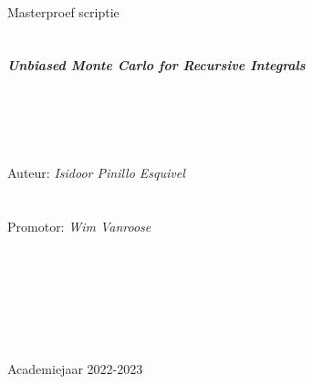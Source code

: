 \begin{titlepage}
    \begin{center}
        \ \
        \ \\
        \ \\
        \ \\
        \ \\
        \ \\
        \ \\
        \ \\
        \ \\
        \ \\
        \ \\
        \ \\
        \Large{M{\sc asterproef scriptie}}
        \ \\
        \ \\
        \ \\
        \huge{\bf{\em Unbiased Monte Carlo for Recursive Integrals}}
        \ \\
        \ \\
        \ \\
        \ \\
        \ \\
        \ \\
        \normalsize
        Auteur: {\em Isidoor Pinillo Esquivel}\\
        \ \\
        \ \\
        Promotor: {\em Wim Vanroose}\\
        \ \\
        \ \\
        \ \\
        \ \\
        \ \\
        \ \\
        \ \\
        A{\sc cademiejaar 2022-2023}

    \end{center}
\end{titlepage}


